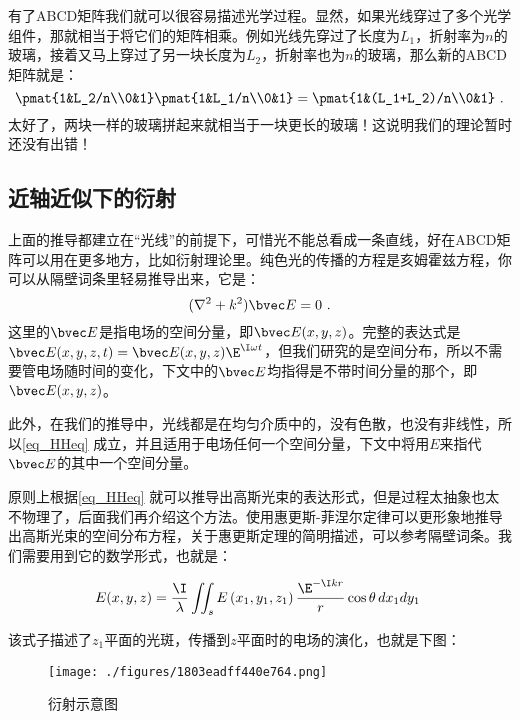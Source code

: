 有了ABCD矩阵我们就可以很容易描述光学过程。显然，如果光线穿过了多个光学组件，那就相当于将它们的矩阵相乘。例如光线先穿过了长度为$L_1$，折射率为$n$的玻璃，接着又马上穿过了另一块长度为$L_2$，折射率也为$n$的玻璃，那么新的ABCD矩阵就是：
\begin{equation}
\pmat{1&L_2/n\\0&1}\pmat{1&L_1/n\\0&1}=\pmat{1&(L_1+L_2)/n\\0&1}~.
\end{equation}
太好了，两块一样的玻璃拼起来就相当于一块更长的玻璃！这说明我们的理论暂时还没有出错！

\subsection{近轴近似下的衍射}
上面的推导都建立在“光线”的前提下，可惜光不能总看成一条直线，好在ABCD矩阵可以用在更多地方，比如衍射理论里。纯色光的传播的方程是亥姆霍兹方程，你可以从隔壁词条里轻易推导出来，它是：
\begin{equation}\label{eq_HHeq}
(\nabla^2+k^2)\bvec E=0~.
\end{equation}
这里的$\bvec E$是指电场的空间分量，即$\bvec E(x,y,z)$。完整的表达式是$\bvec E(x,y,z,t)=\bvec E(x,y,z)\E^{\I \omega t}$，但我们研究的是空间分布，所以不需要管电场随时间的变化，下文中的$\bvec E$均指得是不带时间分量的那个，即$\bvec E(x,y,z)$。

此外，在我们的推导中，光线都是在均匀介质中的，没有色散，也没有非线性，所以\autoref{eq_HHeq} 成立，并且适用于电场任何一个空间分量，下文中将用$E$来指代$\bvec E$的其中一个空间分量。

原则上根据\autoref{eq_HHeq} 就可以推导出高斯光束的表达形式，但是过程太抽象也太不物理了，后面我们再介绍这个方法。使用惠更斯-菲涅尔定律可以更形象地推导出高斯光束的空间分布方程，关于惠更斯定理的简明描述，可以参考隔壁词条。我们需要用到它的数学形式，也就是：

\begin{equation}\label{eq_HF}
E(x,y,z)=\frac{\I}{\lambda}\iint_s E\left(x_1,y_1,z_1\right)\frac{\E^{-\I kr}}{r}\cos\theta\, dx_1 dy_1~
\end{equation}

该式子描述了$z_1$平面的光斑，传播到$z$平面时的电场的演化，也就是下图：

\begin{figure}[ht]
\centering
\texttt{[image: ./figures/1803eadff440e764.png]}
\caption{衍射示意图} \label{fig_GBeam_5}
\end{figure}

